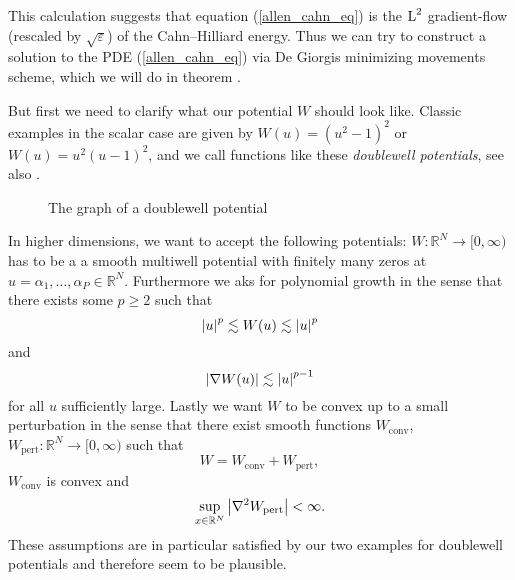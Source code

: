 This calculation suggests that equation (\ref{allen_cahn_eq}) is the $ \operatorname{L}^{ 2 } $ gradient-flow (rescaled by $ \sqrt{\varepsilon} $) of the Cahn--Hilliard energy. Thus we can try to construct a solution to the PDE (\ref{allen_cahn_eq}) via De Giorgis minimizing movements scheme, which we will do in theorem .

But first we need to clarify what our potential $ W $ should look like. Classic examples in the scalar case are given by $ W ( u ) = \left( u^{ 2 } - 1 \right)^{ 2 } $ or $ W( u ) = u^{ 2 } ( u - 1 )^{ 2 } $, and we call functions like these \emph{doublewell potentials}, see also .

\begin{figure}[ht]
\centering
{}
\caption{The graph of a doublewell potential}
\label{graph_of_doublewell_potential}
\end{figure}

In higher dimensions, we want to accept the following potentials: $ W \colon \mathbb{ R }^{ N } \to [0, \infty ) $ has to be a a smooth multiwell potential with finitely many zeros at $ u = \alpha_{ 1 }, \dotsc , \alpha_{ P } \in \mathbb{ R }^{ N } $. Furthermore we aks for polynomial growth in the sense that there exists some $ p \geq 2 $ such that
\begin{equation}
	\label{polynomial_growth}
	\abs{ u }^{ p } \lesssim W(u) \lesssim \abs{ u }^{ p }
\end{equation}
and
\begin{equation}
	\label{polynomial_growth_derivative}
	\abs{ \nabla W ( u ) } \lesssim \abs{ u }^{ p -1 }
\end{equation}
for all $ u $ sufficiently large. Lastly we want $ W $ to be convex up to a small perturbation in the sense that there exist smooth functions 
$ W_{ \mathrm{conv} }$, $ W_{ \mathrm{pert} } \colon \mathbb{ R }^{ N } \to [ 0 , \infty ) $ such that
\begin{equation}
	\label{decomposition_of_w}
	W = W_{ \mathrm{conv}} + W_{ \mathrm{pert}},
\end{equation}
$ W_{ \mathrm{conv} } $ is convex and
\begin{equation}
	\label{perturbation bound}
	\sup_{ x \in \mathbb{ R }^{ N } }
	\abs{ \nabla^{ 2 } W_{ \mathrm{pert} } } < \infty.
\end{equation}
These assumptions are in particular satisfied by our two examples for doublewell potentials and therefore seem to be plausible.

